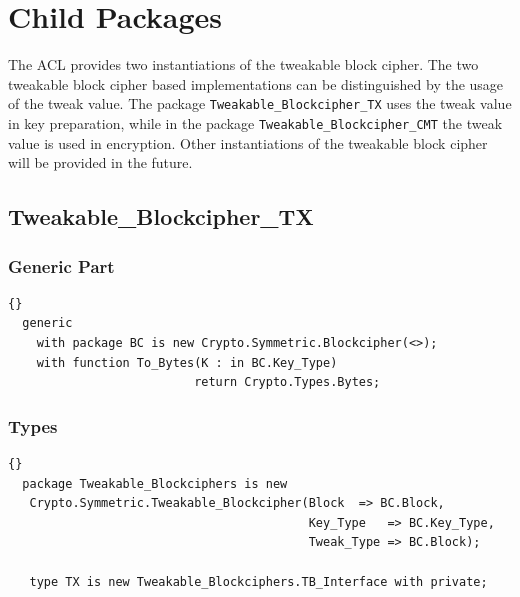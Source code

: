 
\section{Child Packages}
The ACL provides two instantiations of the tweakable block cipher. The
two tweakable block cipher based implementations can be distinguished
by the usage of the tweak value. The package
\texttt{Tweakable\_Blockcipher\_TX} uses the tweak value in key
preparation, while in the package \texttt{Tweakable\_Blockcipher\_CMT}
the tweak value is used in encryption. Other instantiations of the
tweakable block cipher will be provided in the future.
\subsection*{Tweakable\_Blockcipher\_TX}
\subsubsection*{Generic Part}
\begin{lstlisting}{}
  generic
    with package BC is new Crypto.Symmetric.Blockcipher(<>);
    with function To_Bytes(K : in BC.Key_Type)
                          return Crypto.Types.Bytes;
\end{lstlisting}
\subsubsection*{Types}
\begin{lstlisting}{}
  package Tweakable_Blockciphers is new
   Crypto.Symmetric.Tweakable_Blockcipher(Block  => BC.Block,
                                          Key_Type   => BC.Key_Type,
                                          Tweak_Type => BC.Block);

   type TX is new Tweakable_Blockciphers.TB_Interface with private;
\end{lstlisting}

